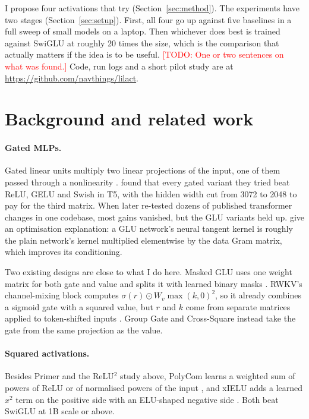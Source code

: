 \documentclass{article}
\newcommand{\todo}[1]{\textcolor{red}{[TODO: #1]}}
\begin{document}
I propose four activations that try (Section~\ref{sec:method}).
The experiments have two stages (Section~\ref{sec:setup}).
First, all four go up against five baselines in a full sweep of small models on a laptop.
Then whichever does best is trained against SwiGLU at roughly 20 times the size, which is the comparison that actually matters if the idea is to be useful.
\todo{One or two sentences on what was found.}
Code, run logs and a short pilot study are at \url{https://github.com/navthings/lilact}.

\section{Background and related work}
\label{sec:related}

\paragraph{Gated MLPs.}
Gated linear units multiply two linear projections of the input, one of them passed through a nonlinearity \citep{dauphin2017glu}.
\citet{shazeer2020glu} found that every gated variant they tried beat ReLU, GELU and Swish in T5, with the hidden width cut from 3072 to 2048 to pay for the third matrix.
When \citet{narang2021transfer} later re-tested dozens of published transformer changes in one codebase, most gains vanished, but the GLU variants held up.
\citet{lyu2026glu} give an optimisation explanation: a GLU network's neural tangent kernel is roughly the plain network's kernel multiplied elementwise by the data Gram matrix, which improves its conditioning.

Two existing designs are close to what I do here.
Masked GLU uses one weight matrix for both gate and value and splits it with learned binary masks \citep{tajima2025mglu}.
RWKV's channel-mixing block computes $\sigma(r) \odot W_v \max(k,0)^2$, so it already combines a sigmoid gate with a squared value, but $r$ and $k$ come from separate matrices applied to token-shifted inputs \citep{peng2023rwkv}.
Group Gate and Cross-Square instead take the gate from the same projection as the value.

\paragraph{Squared activations.}
Besides Primer and the ReLU$^2$ study above, PolyCom learns a weighted sum of powers of ReLU or of normalised powers of the input \citep{zhuo2024polycom}, and xIELU adds a learned $x^2$ term on the positive side with an ELU-shaped negative side \citep{huang2024xielu}.
Both beat SwiGLU at 1B scale or above.
\end{document}
